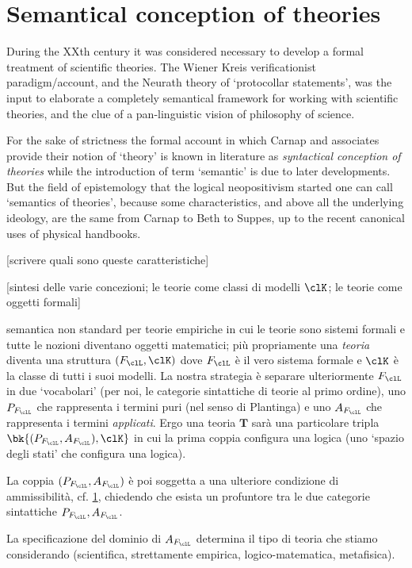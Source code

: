 \section{Semantical conception of theories}
During the XXth century it was considered necessary to develop a formal treatment of scientific theories. The Wiener Kreis verificationist paradigm/account, and the Neurath theory of `protocollar statements', was the input to elaborate a completely semantical framework for working with scientific theories, and the clue of a pan-linguistic vision of philosophy of science.

For the sake of strictness the formal account in which Carnap and associates provide their notion of `theory' is known in literature as \emph{syntactical conception of theories} \cite{?} while the introduction of term `semantic' is due to later developments. But the field of epistemology that the logical neopositivism started one can call `semantics of theories', because some characteristics, and above all the underlying ideology, are the same from Carnap to Beth to Suppes, up to the recent canonical uses of physical handbooks.

	[scrivere quali sono queste caratteristiche]

	[sintesi delle varie concezioni; le teorie come classi di modelli $\clK$;
		le teorie come oggetti formali]

semantica non standard per teorie empiriche in cui le teorie sono sistemi formali e tutte le nozioni diventano oggetti matematici; più propriamente una \emph{teoria} diventa una struttura $(F_\clL, \clK)$ dove $F_\clL$ è il vero sistema formale e $\clK$ è la classe di tutti i suoi modelli. La nostra strategia è separare ulteriormente $F_\clL$ in due `vocabolari' (per noi, le categorie sintattiche di teorie al primo ordine), uno $P_{F_\clL}$ che rappresenta i termini puri (nel senso di Plantinga) e uno $A_{F_\clL}$ che rappresenta i termini \emph{applicati}. Ergo una teoria $\mathbf{T}$ sarà una particolare tripla $\bk{(P_{F_\clL},A_{F_\clL}), \clK}$ in cui la prima coppia configura una logica (uno `spazio degli stati' che configura una logica).

La coppia $(P_{F_\clL},A_{F_\clL})$ è poi soggetta a una ulteriore condizione di ammissibilità, cf. \ref{}, chiedendo che esista un profuntore tra le due categorie sintattiche $P_{F_\clL},A_{F_\clL}$.

La specificazione del dominio di $A_{F_\clL}$ determina il tipo di teoria che stiamo considerando (scientifica, strettamente empirica, logico-matematica, metafisica).

